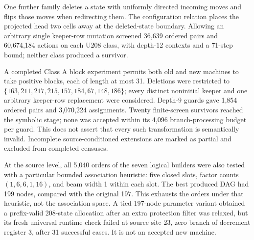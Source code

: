 One further family deletes a state with uniformly directed incoming moves
and flips those moves when redirecting them. The configuration relation
places the projected head two cells away at the deleted-state boundary.
Allowing an arbitrary single keeper-row mutation screened 36,639 ordered
pairs and 60,674,184 actions on each U208 class, with depth-12 contexts and
a 71-step bound; neither class produced a survivor.

A completed Class A block experiment permits both old and new machines
to take positive blocks, each of length at most 31. Deletions were restricted
to $\{163,211,217,215,157,184,67,148,186\}$; every distinct noninitial keeper
and one arbitrary keeper-row replacement were considered. Depth-9 guards
gave 1,854 ordered pairs and 3,070,224 assignments. Twenty finite-screen
survivors reached the symbolic stage; none was accepted within its 4,096
branch-processing budget per guard. This does not assert that every such
transformation is semantically invalid. Incomplete source-conditioned
extensions are marked as partial and excluded from completed censuses.

At the source level, all 5,040 orders of the seven logical builders were
also tested with a particular bounded association heuristic: five closed
slots, factor counts $(1,6,6,1,16)$, and beam width 1 within each slot.
The best produced DAG had 199 nodes, compared with the original 197.
This exhausts the orders under that heuristic, not the association space.
A tied 197-node parameter variant obtained a prefix-valid 208-state
allocation after an extra protection filter was relaxed, but its fresh
universal runtime check failed at source site 23, zero branch of decrement
register 3, after 31 successful cases. It is not an accepted new machine.
